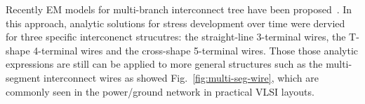 Recently EM models for multi-branch interconnect tree have been
proposed~\cite{ChenHuang:DAC'15,ChenTan:TCAD'16}. In this approach,
analytic solutions for stress development over time were dervied for
three specific interconenct strucutres: the straight-line 3-terminal
wires, the T-shape 4-terminal wires and the cross-shape 5-terminal
wires. Those those analytic expressions are still can be applied to
more general structures such as the multi-segment interconnect wires
as showed Fig.~\ref{fig:multi-seg-wire}, which are commonly seen in
the power/ground network in practical VLSI layouts.





